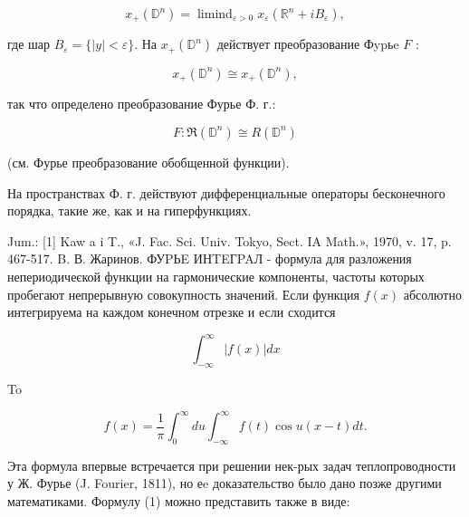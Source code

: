 \documentclass[10pt]{article}
\begin{document}
\[

x_{+}\left(\mathbb{D}^{n}\right)=\operatorname{limind}_{\varepsilon>0} x_{\varepsilon}\left(\mathbb{R}^{n}+i B_{\varepsilon}\right),

\]



где шар $B_{\varepsilon}=\{|y|<\varepsilon\}$. На $x_{+}\left(\mathbb{D}^{n}\right)$ действует преобразование Фypьe $F$ :



\[

x_{+}\left(\mathbb{D}^{n}\right) \cong x_{+}\left(\mathbb{D}^{n}\right),

\]



так что определено преобразование Фурье Ф. г.:



\[

F: \Re\left(\mathbb{D}^{n}\right) \cong R\left(\mathbb{D}^{n}\right)

\]



(см. Фурье преобразование обобщенной функции).



На пространствах Ф. г. действуют дифференциальные операторы бесконечного порядка, такие же, как и на гиперфункциях.



Jum.: [1] Kaw a i T., «J. Fac. Sci. Univ. Tokyo, Sect. IA Math.», 1970, v. 17, p. 467-517. B. В. Жаринов. ФУPЬE ИНTEГPAЛ - формула для разложения непериодичеєкой функции на гармонические компоненты, частоты которых пробегают непрерывную совокупность значений. Если функция $f(x)$ абсолютно интегрируема на каждом конечном отрезке и если сходится



\[

\int_{-\infty}^{\infty}|f(x)| d x

\]



To



\[

f(x)=\frac{1}{\pi} \int_{0}^{\infty} d u \int_{-\infty}^{\infty} f(t) \cos u(x-t) d t .

\]



Эта формула впервые встречается при решении нек-рых задач теплопроводности у Ж. Фурье (J. Fourier, 1811), но еe доказательство было дано позже другими математиками. Формулу (1) можно представить также в виде:
\end{document}
